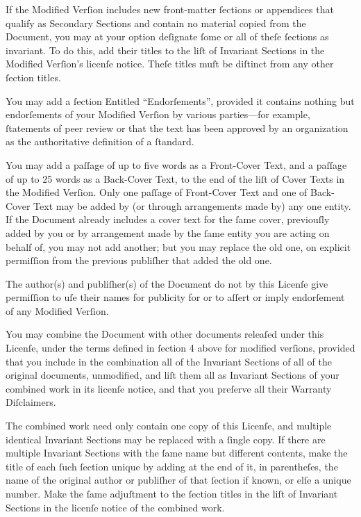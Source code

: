 If the Modified Verſion includes new front-matter ſections or
appendices that qualify as Secondary Sections and contain no material
copied from the Document, you may at your option deſignate ſome or all
of theſe ſections as invariant. To do this, add their titles to the
liſt of Invariant Sections in the Modified Verſion’s licenſe notice.
Theſe titles muſt be diſtinct from any other ſection titles.

You may add a ſection Entitled “Endorſements”, provided it contains
nothing but endorſements of your Modified Verſion by various
parties—for example, ſtatements of peer review or that the text has
been approved by an organization as the authoritative definition of a
ſtandard.

You may add a paſſage of up to five words as a Front-Cover Text, and a
paſſage of up to 25 words as a Back-Cover Text, to the end of the liſt
of Cover Texts in the Modified Verſion. Only one paſſage of
Front-Cover Text and one of Back-Cover Text may be added by (or
through arrangements made by) any one entity. If the Document already
includes a cover text for the ſame cover, previouſly added by you or
by arrangement made by the ſame entity you are acting on behalf of,
you may not add another; but you may replace the old one, on explicit
permiſſion from the previous publiſher that added the old one.

The author(s) and publiſher(s) of the Document do not by this Licenſe
give permiſſion to uſe their names for publicity for or to aſſert or
imply endorſement of any Modified Verſion.


You may combine the Document with other documents releaſed under this
Licenſe, under the terms defined in ſection 4 above for modified
verſions, provided that you include in the combination all of the
Invariant Sections of all of the original documents, unmodified, and
liſt them all as Invariant Sections of your combined work in its
licenſe notice, and that you preſerve all their Warranty Diſclaimers.

The combined work need only contain one copy of this Licenſe, and
multiple identical Invariant Sections may be replaced with a ſingle
copy. If there are multiple Invariant Sections with the ſame name but
different contents, make the title of each ſuch ſection unique by
adding at the end of it, in parentheſes, the name of the original
author or publiſher of that ſection if known, or elſe a unique number.
Make the ſame adjuſtment to the ſection titles in the liſt of
Invariant Sections in the licenſe notice of the combined work.

